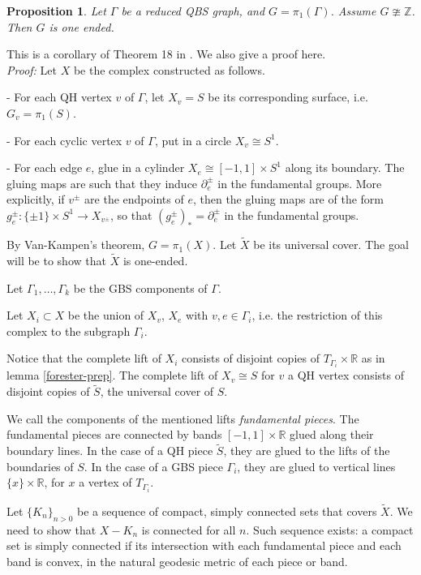 \documentclass[12pt]{amsart}
\newtheorem{proposition}[theorem]{Proposition}
\newcommand{\Z}{\mathbb{Z}}
\newcommand{\R}{\mathbb{R}}
\begin{document}
\begin{proposition} \label{one-end} Let $\Gamma$ be a reduced QBS graph, and $G=\pi_1(\Gamma)$. Assume $G\ncong\Z$. Then $G$ is one ended.
\end{proposition}

This is a corollary of Theorem 18 in \cite{wilton2}. We also give a proof here.\\

{\em Proof:} Let $X$ be the complex constructed as follows. 

- For each QH vertex $v$ of $\Gamma$, let $X_v=S$ be its corresponding surface, i.e. $G_v=\pi_1(S)$.

- For each cyclic vertex $v$ of $\Gamma$, put in a circle $X_v\cong S^1$.

- For each edge $e$, glue in a cylinder $X_e \cong [-1,1] \times S^1$ along its boundary. The gluing maps are such that they induce $\partial^{\pm}_e$ in the fundamental groups. More explicitly, if $v^{\pm}$ are the endpoints of $e$, then the gluing maps are of the form  $g_e^{\pm}: \{\pm 1 \}\times S^1 \to X_{v^{\pm}}$, so that $(g_e^{\pm})_* = \partial_e^{\pm}$ in the fundamental groups.

By Van-Kampen's theorem, $G=\pi_1(X)$. Let $\tilde X$ be its universal cover. The goal will be to show that $\tilde X$ is one-ended.


Let $\Gamma_1,\ldots,\Gamma_k$ be the GBS components of $\Gamma$. 

Let $X_i \subset X$ be the union of $X_v$, $X_e$ with $v,e\in \Gamma_i$, i.e. the restriction of this complex to the subgraph $\Gamma_i$. 

Notice that the complete lift of $X_i$ consists of disjoint copies of $T_{\Gamma_i}\times \R$ as in lemma \ref{forester-prep}. The complete lift of $X_v\cong S$ for $v$ a QH vertex consists of disjoint copies of $\tilde S$, the universal cover of $S$.

We call the components of the mentioned lifts {\em fundamental pieces}. The fundamental pieces are connected by bands $[-1,1]\times \R$ glued along their boundary lines. In the case of a QH piece $\tilde S$, they are glued to the lifts of the boundaries of $S$. In the case of a GBS piece $\Gamma_i$, they are glued to vertical lines $\{ x\}\times \R$, for $x$ a vertex of $T_{\Gamma_i}$.



Let $\{K_n \}_{n>0}$ be a sequence of compact, simply connected sets that covers $\tilde X$. We need to show that $X-K_n$ is connected for all $n$.
Such sequence exists: a compact set is simply connected if its intersection with each fundamental piece and each band is convex, in the natural geodesic metric of each piece or band.
\end{document}
